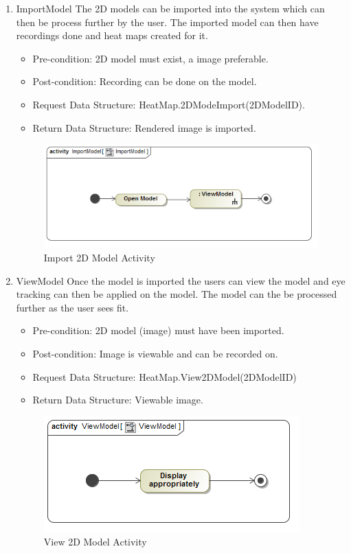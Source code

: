 	\begin{enumerate}
		\item{ImportModel}
		\newline
		The 2D models can be imported into the system which can then be process further by the user. The imported model can then have recordings done and heat maps created for it. 
		\begin{itemize}
			\item Pre-condition: 2D model must exist, a image preferable.
			\item Post-condition: Recording can be done on the model.
			\item Request Data Structure: HeatMap.2DModeImport(2DModelID).
			\item Return Data Structure: Rendered image is imported.
		\end{itemize}
		
		\begin{figure}[!ht]
			\centering
			\includegraphics[scale=0.5]{Diagrams/Activity_Diagram__ImportModel__ImportModel.png}
			\caption{Import 2D Model Activity}
		\end{figure}
	
		\item{ViewModel}
		Once the model is imported the users can view the model and eye tracking can then be applied on the model. The model can the be processed further as the user sees fit.
		\begin{itemize}
			\item Pre-condition: 2D model (image) must have been imported.
			\item Post-condition: Image is viewable and can be recorded on.
			\item Request Data Structure: HeatMap.View2DModel(2DModelID)
			\item Return Data Structure: Viewable image.
		\end{itemize}
		
		\begin{figure}[!ht]
			\centering
			\includegraphics[scale=0.5]{Diagrams/Activity_Diagram__ViewModel__ViewModel.png}
			\caption{View 2D Model Activity}
		\end{figure}
	

\end{enumerate}
